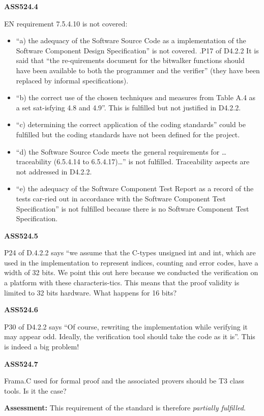 {\bfseries ASS524.4}

EN requirement 7.5.4.10 is not covered:
\begin{itemize}
\item	“a) the adequacy of the Software Source Code as a implementation of the Software Component Design Specification” is not covered. .P17 of D4.2.2 It is said that “the re-quirements document for the bitwalker functions should have been available to both the programmer and the verifier” (they have been replaced by informal specifications).
\item	“b) the correct use of the chosen techniques and measures from Table A.4 as a set sat-isfying 4.8 and 4.9”. This is fulfilled but not justified in D4.2.2.
\item	“c) determining the correct application of the coding standards” could be fulfilled but the coding standards have not been defined for the project.
\item	“d) the Software Source Code meets the general requirements for … traceability (6.5.4.14 to 6.5.4.17)…” is not fulfilled. Traceability aspects are not addressed in D4.2.2. 
\item	“e) the adequacy of the Software Component Test Report as a record of the tests car-ried out in accordance with the Software Component Test Specification” is not fulfilled because there is no Software Component Test Specification.
\end{itemize}

{\bfseries ASS524.5}

P24 of D.4.2.2 says “we assume that the C-types unsigned int and int, which are used in the implementation to represent indices, counting and error codes, have a width of 32 bits. We point this out here because we conducted the verification on a platform with these characteris-tics.
This means that the proof validity is limited to 32 bits hardware. What happens for 16 bits?

{\bfseries ASS524.6}

P30 of D4.2.2 says “Of course, rewriting the implementation while verifying it may appear odd. Ideally, the verification tool should take the code as it is”.
This is indeed a big problem!

{\bfseries ASS524.7}

Frama.C used for formal proof and the associated provers should be T3 class tools. Is it the case?

\bigskip

\textbf{Assessment:}
\bigskip
This requirement of the standard is therefore \textit{partially fulfilled}.
\bigskip


